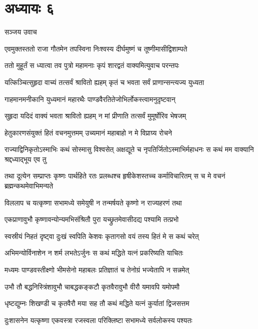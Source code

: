 \chapter{अध्यायः ६}
\twolineshloka
{सञ्जय उवाच}
{}


\twolineshloka
{एवमुक्तस्ततो राजा गौतमेन तपस्विना}
{निःश्वस्य दीर्घमुष्णं च तूष्णीमासीद्विशाम्पते}


\twolineshloka
{ततो मुहूर्तं स ध्यात्वा तव पुत्रो महामनाः}
{कृपं शारद्वतं वाक्यमित्युवाच परन्तपः}


\twolineshloka
{यत्किञ्चित्सुहृदा वाच्यं तत्सर्वं श्रावितो ह्यहम्}
{कृतं च भवता सर्वं प्राणान्सन्त्यज्य युध्यता}


\twolineshloka
{गाहमानमनीकानि युध्यमानं महारथैः}
{पाण्डवैरतितेजोभिर्लोकस्त्वामनुदृष्टवान्}


\twolineshloka
{सुहृदा यदिदं वाक्यं भवता श्रावितो ह्यहम्}
{न मां प्रीणाति तत्सर्वं मुमूर्षोरिव भेषजम्}


\twolineshloka
{हेतुकारणसंयुक्तं हितं वचनमुत्तमम्}
{उच्यमानं महाबाहो न मे विप्राग्र्य रोचने}


राज्याद्विनिकृतोऽस्माभिः कथं सोस्मासु विश्वसेत्
\twolineshloka
{अक्षद्यूते च नृपतिर्जितोऽस्माभिर्महाधनः}
{स कथं मम वाक्यानि श्रद्दध्याद्भूय एव तु}


\threelineshloka
{तथा दूत्येन सम्प्राप्तः कृष्णः पार्थहिते रतः}
{प्रलब्धश्च हृषीकेशस्तच्च कर्माविचारितम्}
{स च मे वचनं ब्रह्मन्कथमेवाभिमन्यते}


\twolineshloka
{विललाप च यत्कृष्णा सभामध्ये समेयुषी}
{न तन्मर्षयते कृष्णो न राज्यहरणं तथा}


\twolineshloka
{एकप्राणावुभौ कृष्णावन्योन्यमभिसंश्रितौ}
{पुरा यच्छ्रुतमेवासीदद्य पश्यामि तत्प्रभो}


\twolineshloka
{स्वस्रीयं निहतं दृष्ट्वा दुःखं स्वपिति केशवः}
{कृतागसो वयं तस्य हितं मे स कथं चरेत्}


\twolineshloka
{अभिमन्योर्विनाशेन न शर्म लभतेऽर्जुनः}
{स कथं मद्धिते यत्नं प्रकरिष्यति याचितः}


\twolineshloka
{मध्यमः पाण्डवस्तीक्ष्णो भीमसेनो महाबलः}
{प्रतिज्ञातं च तेनोग्रं भज्येतापि न सन्नमेत्}


\twolineshloka
{उभौ तौ बद्धनिस्त्रिंशावुभौ चाबद्धकङ्कटौ}
{कृतवैरावुभौ वीरौ यमावपि यमोपमौ}


\twolineshloka
{धृष्टद्युम्नः शिखण्डी च कृतवैरौ मया सह}
{तौ कथं मद्धिते यत्नं कुर्यातां द्विजसत्तम}


\twolineshloka
{दुःशासनेन यत्कृष्णा एकवस्त्रा रजस्वला}
{परिक्लिष्टा सभामध्ये सर्वलोकस्य पश्यतः}


